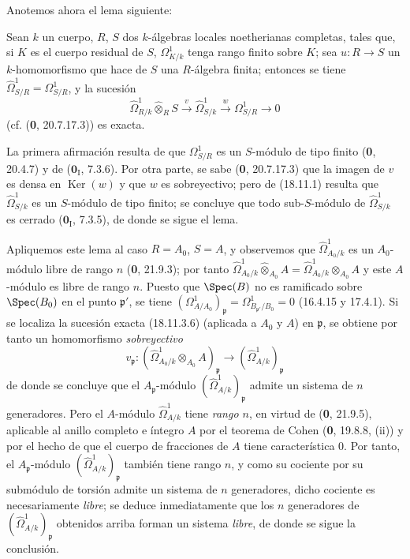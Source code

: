 Anotemos ahora el lema siguiente:

\begin{lemma}[18.11.3.5]
\label{IV.18.11.3.5}
Sean $k$ un cuerpo, $R$, $S$ dos $k$-álgebras locales noetherianas completas, tales que, si $K$ es el cuerpo residual de $S$, $\Omega^1_{K/k}$ tenga rango finito sobre $K$; sea $u:R\to S$ un $k$-homomorfismo que hace de $S$ una $R$-álgebra finita; entonces se tiene $\hat{\Omega}^1_{S/R}=\Omega^1_{S/R}$, y la sucesión
\begin{equation}
\label{IV.18.11.3.6}
\tag{18.11.3.6}
  \hat{\Omega}^1_{R/k}\widehat{\otimes}_R S\xrightarrow{v}\hat{\Omega}^1_{S/k}\xrightarrow{w}\Omega^1_{S/R}\to0
\end{equation}
\textup{(cf. (\textbf 0, 20.7.17.3))} es exacta.
\end{lemma}

La primera afirmación resulta de que $\Omega^1_{S/R}$ es un $S$-módulo de tipo finito (\textbf 0, 20.4.7) y de ($\mathbf{0}_{\mathrm I}$, 7.3.6). Por otra parte, se sabe (\textbf 0, 20.7.17.3) que la imagen de $v$ es densa en $\operatorname{Ker}(w)$ y que $w$ es sobreyectivo; pero de (18.11.1) resulta que $\hat{\Omega}^1_{S/k}$ es un $S$-módulo de tipo finito; se concluye que todo sub-$S$-módulo de $\hat{\Omega}^1_{S/k}$ es cerrado ($\mathbf{0}_{\mathrm I}$, 7.3.5), de donde se sigue el lema.

Apliquemos este lema al caso $R=A_0$, $S=A$, y observemos que $\hat{\Omega}^1_{A_0/k}$ es un $A_0$-módulo libre de rango $n$ (\textbf 0, 21.9.3); por tanto $\hat{\Omega}^1_{A_0/k}\widehat{\otimes}_{A_0}A=\hat{\Omega}^1_{A_0/k}\otimes_{A_0}A$ y este $A$-módulo es libre de rango $n$. Puesto que $\Spec(B)$ no es ramificado sobre $\Spec(B_0)$ en el punto $\mathfrak p'$, se tiene $(\Omega^1_{A/A_0})_{\mathfrak p}=\Omega^1_{B_{\mathfrak p'}/B_0}=0$ (16.4.15 y 17.4.1). Si se localiza la sucesión exacta (18.11.3.6) (aplicada a $A_0$ y $A$) en $\mathfrak p$, se obtiene por tanto un homomorfismo \emph{sobreyectivo}
\[
  v_{\mathfrak p}:(\hat{\Omega}^1_{A_0/k}\otimes_{A_0}A)_{\mathfrak p}\longrightarrow(\hat{\Omega}^1_{A/k})_{\mathfrak p}
\]
de donde se concluye que el $A_{\mathfrak p}$-módulo $(\hat{\Omega}^1_{A/k})_{\mathfrak p}$ admite un sistema de $n$ generadores. Pero el $A$-módulo $\hat{\Omega}^1_{A/k}$ tiene \emph{rango $n$}, en virtud de (\textbf 0, 21.9.5), aplicable al anillo completo e íntegro $A$ por el teorema de Cohen (\textbf 0, 19.8.8, (ii)) y por el hecho de que el cuerpo de fracciones de $A$ tiene característica 0. Por tanto, el $A_{\mathfrak p}$-módulo $(\hat{\Omega}^1_{A/k})_{\mathfrak p}$ también tiene rango $n$, y como su cociente por su submódulo de torsión admite un sistema de $n$ generadores, dicho cociente es necesariamente \emph{libre}; se deduce inmediatamente que los $n$ generadores de $(\hat{\Omega}^1_{A/k})_{\mathfrak p}$ obtenidos arriba forman un sistema \emph{libre}, de donde se sigue la conclusión.

